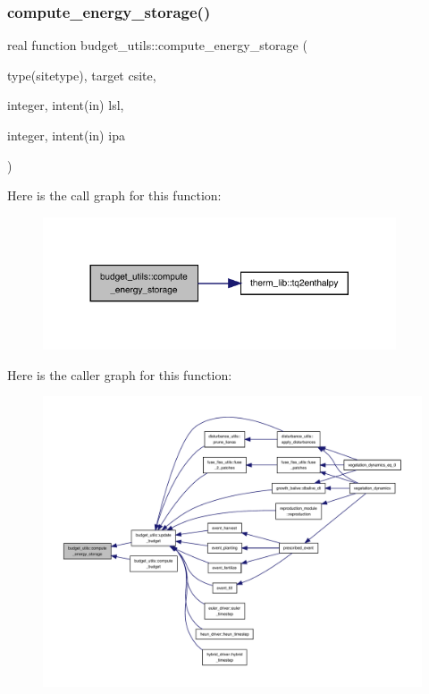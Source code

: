 \subsubsection{\texorpdfstring{compute\+\_\+energy\+\_\+storage()}{compute\_energy\_storage()}}
{\footnotesize\ttfamily real function budget\+\_\+utils\+::compute\+\_\+energy\+\_\+storage (\begin{DoxyParamCaption}\item[{type(sitetype), target}]{csite,  }\item[{integer, intent(in)}]{lsl,  }\item[{integer, intent(in)}]{ipa }\end{DoxyParamCaption})}

Here is the call graph for this function\+:
\nopagebreak
\begin{figure}[H]
\begin{center}
\leavevmode
\includegraphics[width=296pt]{namespacebudget__utils_a319c5f7252c344bcebbd162593e25ec8_cgraph}
\end{center}
\end{figure}
Here is the caller graph for this function\+:
\nopagebreak
\begin{figure}[H]
\begin{center}
\leavevmode
\includegraphics[width=350pt]{namespacebudget__utils_a319c5f7252c344bcebbd162593e25ec8_icgraph}
\end{center}
\end{figure}
\mbox{\label{namespacebudget__utils_a6111a1c211ecef562368c8635f64af45}} 
